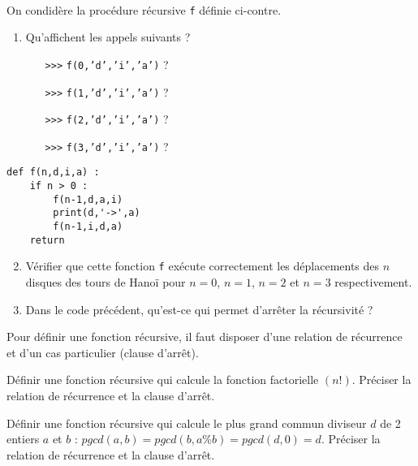 \begin{question}\mbox{}\\
\noindent\begin{minipage}[t]{7.5cm}
On condidère la procédure récursive \texttt{f} définie ci-contre.
\begin{enumerate}
\item Qu'affichent les appels suivants ?
\begin{itemize}
\item[\texttt{>{>}>}] \texttt{f(0,'d','i','a')} ?
\item[\texttt{>{>}>}] \texttt{f(1,'d','i','a')} ?
\item[\texttt{>{>}>}] \texttt{f(2,'d','i','a')} ?
\item[\texttt{>{>}>}] \texttt{f(3,'d','i','a')} ?
\end{itemize}
\end{enumerate}
\end{minipage}
\hfill
\begin{minipage}[t]{7cm}\em
\begin{lstlisting}
def f(n,d,i,a) :
    if n > 0 :
        f(n-1,d,a,i)
        print(d,'->',a)
        f(n-1,i,d,a)
    return
\end{lstlisting}
\end{minipage}
\begin{enumerate}\setcounter{enumi}{1}
\item Vérifier que cette fonction \texttt{f} exécute correctement les 
	déplacements des $n$ disques des tours de Hanoï pour $n=0$, $n=1$, 
	$n=2$ et $n=3$ respectivement.
\item Dans le code précédent, qu'est-ce qui permet d'arrêter la récursivité ?
\end{enumerate}
\end{question}

Pour définir une fonction récursive, il faut disposer d'une relation de récurrence et d'un
cas particulier (clause d'arrêt).

\begin{question}
Définir une fonction récursive qui calcule la fonction factorielle $(n!)$.
Préciser la relation de récurrence et la clause d'arrêt.
\end{question}

\begin{question}
Définir une fonction récursive qui calcule le plus grand commun diviseur $d$ de 2
entiers $a$ et $b$ : ${pgcd}(a,b) = {pgcd}(b,a\%b) = {pgcd}(d,0) = d$.
Préciser la relation de récurrence et la clause d'arrêt.
\end{question}

